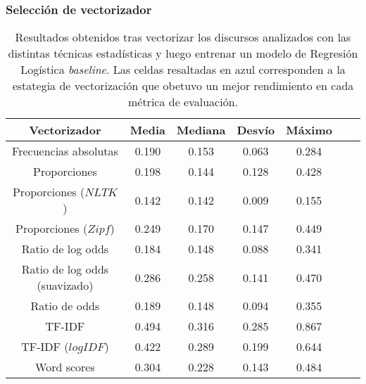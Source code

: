 \subsubsection{Selección de vectorizador}
\label{appendix-table-vectorizers}

\begin{table}[!htb]
    \centering
    \begin{tabular}{ |c|c|c|c|c|c|c| }
    \hline
    Vectorizador & Media & Mediana & Desvío & Máximo \\
    \hline\hline
    Frecuencias absolutas & 0.190 & 0.153 & 0.063 & 0.284 \\
    \hline
    Proporciones & 0.198 & 0.144 & 0.128 & 0.428 \\
    \hline
    Proporciones ($NLTK$) & \cellcolor{highlight-blue!60}0.142 & \cellcolor{highlight-blue!60}0.142 & \cellcolor{highlight-blue!60}0.009 & \cellcolor{highlight-blue!60}0.155 \\
    \hline
    Proporciones ($Zipf$) & 0.249 & 0.170 & 0.147 & 0.449 \\
    \hline
    Ratio de log odds & 0.184 & 0.148 & 0.088 & 0.341 \\
    \hline
    Ratio de log odds (suavizado) & 0.286 & 0.258 & 0.141 & 0.470 \\
    \hline
    Ratio de odds & 0.189 & 0.148 & 0.094 & 0.355 \\
    \hline
    TF-IDF & \cellcolor{highlight-orange!60}0.494 & \cellcolor{highlight-orange!60}0.316 & \cellcolor{highlight-orange!60}0.285 & \cellcolor{highlight-orange!60}0.867 \\
    \hline
    TF-IDF ($log IDF$) & 0.422 & 0.289 & 0.199 & 0.644 \\
    \hline
    Word scores & 0.304 & 0.228 & 0.143 & 0.484 \\
    \hline
\end{tabular}
\caption{Resultados obtenidos tras vectorizar los discursos analizados
con las distintas técnicas estadísticas y luego entrenar un modelo de
Regresión Logística \textit{baseline}. Las celdas resaltadas en azul corresponden
a la estategia de vectorización que obetuvo un mejor rendimiento en cada
métrica de evaluación.}
\label{table-appendix-fit-time}
\end{table}
\FloatBarrier


   